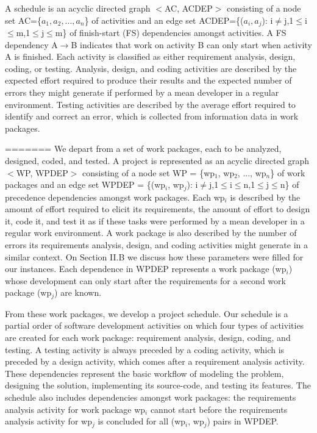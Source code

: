 \documentclass[conference]{IEEEtran}
\begin{document}
A schedule is an acyclic directed graph $<$AC, ACDEP$>$ consisting of a node set AC=\{$a_1, a_2, ..., a_n$\} of activities and an edge set ACDEP=\{($a_i, a_j$): i$\not=$j,1$\leq$i$\leq$m,1$\leq$j$\leq$m\} of finish-start (FS) dependencies amongst activities. A FS dependency A$\rightarrow$B indicates that work on activity B can only start when activity A is finished. Each activity is classified as either requirement analysis, design, coding, or testing. Analysis, design, and coding activities are described by the expected effort required to produce their results and the expected number of errors they might generate if performed by a mean developer in a regular environment. Testing activities are described by the average effort required to identify and correct an error, which is collected from information data in work packages.

=======
We depart from a set of work packages, each to be analyzed, designed, coded, and tested. A project is represented as an acyclic directed graph $<$WP, WPDEP$>$ consisting of a node set WP = \{wp$_{1}$, wp$_{2}$, ..., wp$_{n}$\} of work packages and an edge set WPDEP = \{(wp$_{i}$, wp$_{j}$): i$\not=$j,1$\leq$i$\leq$n,1$\leq$j$\leq$n\} of precedence dependencies amongst work packages. Each wp$_{i}$ is described by the amount of effort required to elicit its requirements, the amount of effort to design it, code it, and test it as if these tasks were performed by a mean developer in a regular work environment. A work package is also described by the number of errors its requirements analysis, design, and coding activities might generate in a similar context. On Section II.B we discuss how these parameters were filled for our instances. Each dependence in WPDEP represents a work package (wp$_{i}$) whose development can only start after the requirements for a second work package (wp$_{j}$) are known.

From these work packages, we develop a project schedule. Our schedule is a partial order of software development activities on which four types of activities are created for each work package: requirement analysis, design, coding, and testing. A testing activity is always preceded by a coding activity, which is preceded by a design activity, which comes after a requirement analysis activity. These dependencies represent the basic workflow of modeling the problem, designing the solution, implementing its source-code, and testing its features. The schedule also includes dependencies amongst work packages: the requirements analysis activity for work package wp$_{i}$ cannot start before the requirements analysis activity for wp$_{j}$ is concluded for all (wp$_{i}$, wp$_{j}$) pairs in WPDEP. 
\end{document}
